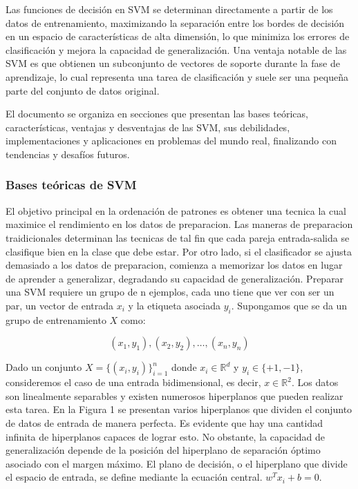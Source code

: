  Las funciones de decisión en SVM se determinan directamente a partir de los datos de entrenamiento, maximizando la separación entre los bordes de decisión en un espacio de características de alta dimensión, lo que minimiza los errores de clasificación y mejora la capacidad de generalización. Una ventaja notable de las SVM es que obtienen un subconjunto de vectores de soporte durante la fase de aprendizaje, lo cual representa una tarea de clasificación y suele ser una pequeña parte del conjunto de datos original.
 
 El documento se organiza en secciones que presentan las bases teóricas, características, ventajas y desventajas de las SVM, sus debilidades, implementaciones y aplicaciones en problemas del mundo real, finalizando con tendencias y desafíos futuros.
\subsubsection{Bases teóricas de SVM}

El objetivo principal en la ordenación de patrones es obtener una tecnica la cual maximice el rendimiento en los datos de preparacion. Las maneras de preparacion traidicionales determinan las tecnicas de tal fin que cada pareja entrada-salida se clasifique bien en la clase que debe estar. Por otro lado, si el clasificador se ajusta demasiado a los datos de preparacion, comienza a memorizar los datos en lugar de aprender a generalizar, degradando su capacidad de generalización. 
Preparar una SVM requiere un grupo de n ejemplos, cada uno tiene que ver con ser un par, un vector de entrada \(x_i\) y la etiqueta asociada \(y_i\). Supongamos que se da un grupo de entrenamiento \(X\) como:

\begin{equation}
	(x_1, y_1), (x_2, y_2), \ldots, (x_n, y_n)
\end{equation}

Dado un conjunto $X = \{(x_i, y_i)\}_{i=1}^n$ donde $x_i \in \mathbb{R}^d$ y $y_i \in \{+1, -1\}$, consideremos el caso de una entrada bidimensional, es decir, $x \in \mathbb{R}^2$. Los datos son linealmente separables y existen numerosos hiperplanos que pueden realizar esta tarea. En la Figura 1 se presentan varios hiperplanos que dividen el conjunto de datos de entrada de manera perfecta. Es evidente que hay una cantidad infinita de hiperplanos capaces de lograr esto. No obstante, la capacidad de generalización depende de la posición del hiperplano de separación óptimo asociado con el margen máximo. El plano de decisión, o el hiperplano que divide el espacio de entrada, se define mediante la ecuación central. $w^T x_i + b = 0$.


